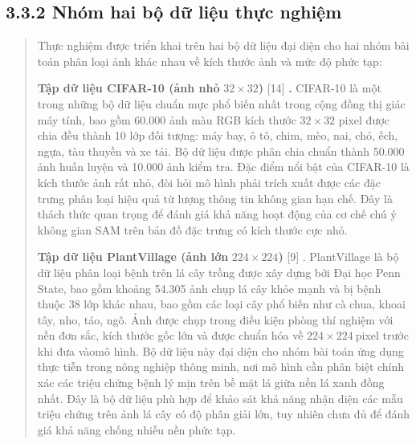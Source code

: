 \documentclass[
  12pt,
  a4paper,
]{report}
\begin{document}
\subsection*{3.3.2 Nhóm hai bộ dữ liệu thực
nghiệm}\label{nhuxf3m-hai-bux1ed9-dux1eef-liux1ec7u-thux1ef1c-nghiux1ec7m}

\begin{quote}
Thực nghiệm được triển khai trên hai bộ dữ liệu đại diện cho hai nhóm
bài toán phân loại ảnh khác nhau về kích thước ảnh và mức độ phức tạp:

\textbf{Tập dữ liệu CIFAR-10 (ảnh nhỏ} \(32 \times 32\)\textbf{)}
{[}14{]} \textbf{.} CIFAR-10 là một trong những bộ dữ liệu chuẩn mực phổ
biến nhất trong cộng đồng thị giác máy tính, bao gồm 60.000 ảnh màu RGB
kích thước \(32 \times 32\) pixel được chia đều thành 10 lớp đối tượng:
máy bay, ô tô, chim, mèo, nai, chó, ếch, ngựa, tàu thuyền và xe tải. Bộ
dữ liệu được phân chia chuẩn thành 50.000 ảnh huấn luyện và 10.000 ảnh
kiểm tra. Đặc điểm nổi bật của CIFAR-10 là kích thước ảnh rất nhỏ, đòi
hỏi mô hình phải trích xuất được các đặc trưng phân loại hiệu quả từ
lượng thông tin không gian hạn chế. Đây là thách thức quan trọng để đánh
giá khả năng hoạt động của cơ chế chú ý không gian SAM trên bản đồ đặc
trưng có kích thước cực nhỏ.

\textbf{Tập dữ liệu PlantVillage (ảnh lớn} \(224 \times 224\)\textbf{)}
{[}9{]} . PlantVillage là bộ dữ liệu phân loại bệnh trên lá cây trồng
được xây dựng bởi Đại học Penn State, bao gồm khoảng 54.305 ảnh chụp lá
cây khỏe mạnh và bị bệnh thuộc 38 lớp khác nhau, bao gồm các loại cây
phổ biến như cà chua, khoai tây, nho, táo, ngô. Ảnh được chụp trong điều
kiện phòng thí nghiệm với nền đơn sắc, kích thước gốc lớn và được chuẩn
hóa về \(224 \times 224\ \)pixel trước khi đưa vàomô hình. Bộ dữ liệu
này đại diện cho nhóm bài toán ứng dụng thực tiễn trong nông nghiệp
thông minh, nơi mô hình cần phân biệt chính xác các triệu chứng bệnh lý
mịn trên bề mặt lá giữa nền lá xanh đồng nhất. Đây là bộ dữ liệu phù hợp
để khảo sát khả năng nhận diện các mẫu triệu chứng trên ảnh lá cây có độ
phân giải lớn, tuy nhiên chưa đủ để đánh giá khả năng chống nhiễu nền
phức tạp.
\end{quote}
\end{document}
